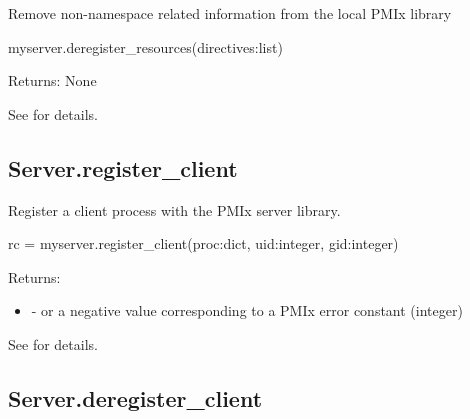 \summary

Remove non-namespace related information from the local \ac{PMIx} library

\format

\pyspecificstart
\begin{codepar}
myserver.deregister_resources(directives:list)
\end{codepar}
\pyspecificend


\begin{arglist}
\end{arglist}

Returns: None

See  for details.


\subsection{Server.register_client}

\summary
Register a client process with the PMIx server library.

\format

\pyspecificstart
\begin{codepar}
rc = myserver.register_client(proc:dict, uid:integer, gid:integer)
\end{codepar}
\pyspecificend


\begin{arglist}
\end{arglist}

Returns:

\begin{itemize}
    \item {} -  or a negative value corresponding to a PMIx error constant (integer)
\end{itemize}

See  for details.


\subsection{Server.deregister_client}

